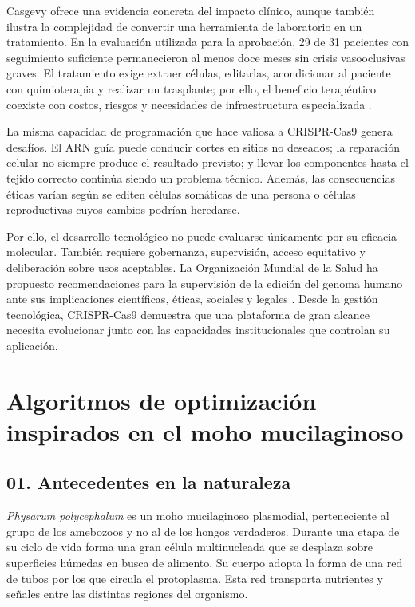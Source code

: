 \documentclass[11pt,letterpaper]{article}
\begin{document}
Casgevy ofrece una evidencia concreta del impacto clínico, aunque también
ilustra la complejidad de convertir una herramienta de laboratorio en un
tratamiento. En la evaluación utilizada para la aprobación, 29 de 31 pacientes
con seguimiento suficiente permanecieron al menos doce meses sin crisis
vasooclusivas graves. El tratamiento exige extraer células, editarlas,
acondicionar al paciente con quimioterapia y realizar un trasplante; por ello,
el beneficio terapéutico coexiste con costos, riesgos y necesidades de
infraestructura especializada \parencite{fda2023}.

La misma capacidad de programación que hace valiosa a CRISPR-Cas9 genera
desafíos. El ARN guía puede conducir cortes en sitios no deseados; la reparación
celular no siempre produce el resultado previsto; y llevar los componentes
hasta el tejido correcto continúa siendo un problema técnico. Además, las
consecuencias éticas varían según se editen células somáticas de una persona o
células reproductivas cuyos cambios podrían heredarse.

Por ello, el desarrollo tecnológico no puede evaluarse únicamente por su
eficacia molecular. También requiere gobernanza, supervisión, acceso
equitativo y deliberación sobre usos aceptables. La Organización Mundial de la
Salud ha propuesto recomendaciones para la supervisión de la edición del
genoma humano ante sus implicaciones científicas, éticas, sociales y legales
\parencite{who2021}. Desde la gestión tecnológica, CRISPR-Cas9 demuestra que
una plataforma de gran alcance necesita evolucionar junto con las capacidades
institucionales que controlan su aplicación.

\section{Algoritmos de optimización inspirados en el moho mucilaginoso}

\subsection*{01. Antecedentes en la naturaleza}

\emph{Physarum polycephalum} es un moho mucilaginoso plasmodial, perteneciente
al grupo de los amebozoos y no al de los hongos verdaderos. Durante una etapa
de su ciclo de vida forma una gran célula multinucleada que se desplaza sobre
superficies húmedas en busca de alimento. Su cuerpo adopta la forma de una red
de tubos por los que circula el protoplasma. Esta red transporta nutrientes y
señales entre las distintas regiones del organismo.
\end{document}
